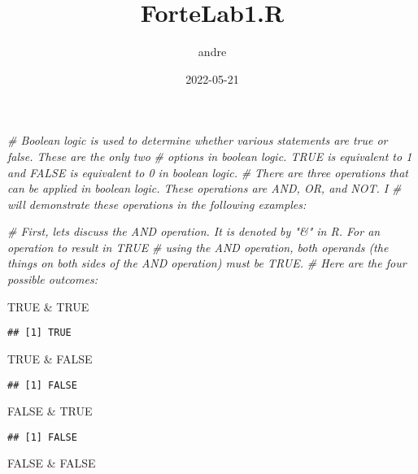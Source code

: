 \documentclass[
]{article}
\title{ForteLab1.R}
\author{andre}
\date{2022-05-21}
\newenvironment{Shaded}{\begin{snugshade}}{\end{snugshade}}
\newcommand{\CommentTok}[1]{\textcolor[rgb]{0.56,0.35,0.01}{\textit{#1}}}
\newcommand{\ConstantTok}[1]{\textcolor[rgb]{0.00,0.00,0.00}{#1}}
\newcommand{\SpecialCharTok}[1]{\textcolor[rgb]{0.00,0.00,0.00}{#1}}
\begin{document}
\maketitle

\begin{Shaded}
\begin{Highlighting}[]
\CommentTok{\# Boolean logic is used to determine whether various statements are true or false. These are the only two }
\CommentTok{\# options in boolean logic. TRUE is equivalent to 1 and FALSE is equivalent to 0 in boolean logic. }
\CommentTok{\# There are three operations that can be applied in boolean logic. These operations are AND, OR, and NOT. I}
\CommentTok{\# will demonstrate these operations in the following examples:}

\CommentTok{\# First, let\textquotesingle{}s discuss the AND operation. It is denoted by "\&" in R. For an operation to result in TRUE }
\CommentTok{\# using the AND operation, both operands (the things on both sides of the AND operation) must be TRUE. }
\CommentTok{\# Here are the four possible outcomes:}

\ConstantTok{TRUE} \SpecialCharTok{\&} \ConstantTok{TRUE}
\end{Highlighting}
\end{Shaded}

\begin{verbatim}
## [1] TRUE
\end{verbatim}

\begin{Shaded}
\begin{Highlighting}[]
\ConstantTok{TRUE} \SpecialCharTok{\&} \ConstantTok{FALSE}
\end{Highlighting}
\end{Shaded}

\begin{verbatim}
## [1] FALSE
\end{verbatim}

\begin{Shaded}
\begin{Highlighting}[]
\ConstantTok{FALSE} \SpecialCharTok{\&} \ConstantTok{TRUE}
\end{Highlighting}
\end{Shaded}

\begin{verbatim}
## [1] FALSE
\end{verbatim}

\begin{Shaded}
\begin{Highlighting}[]
\ConstantTok{FALSE} \SpecialCharTok{\&} \ConstantTok{FALSE}
\end{Highlighting}
\end{Shaded}
\end{document}

